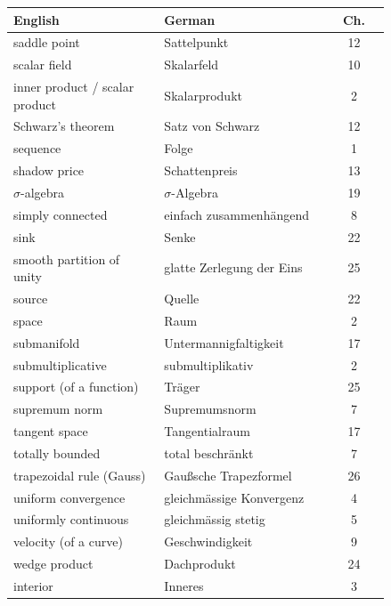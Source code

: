 \begin{center}
\begin{tabular}{@{}p{0.40\linewidth} p{0.44\linewidth} c@{}}
\textbf{English} & \textbf{German} & \textbf{Ch.} \\
\hline
saddle point & Sattelpunkt & 12 \\
scalar field & Skalarfeld & 10 \\
inner product / scalar product & Skalarprodukt & 2 \\
Schwarz's theorem & Satz von Schwarz & 12 \\
sequence & Folge & 1 \\
shadow price & Schattenpreis & 13 \\
$\sigma$-algebra & $\sigma$-Algebra & 19 \\
simply connected & einfach zusammenhängend & 8 \\
sink & Senke & 22 \\
smooth partition of unity & glatte Zerlegung der Eins & 25 \\
source & Quelle & 22 \\
space & Raum & 2 \\
submanifold & Untermannigfaltigkeit & 17 \\
submultiplicative & submultiplikativ & 2 \\
support (of a function) & Träger & 25 \\
supremum norm & Supremumsnorm & 7 \\
tangent space & Tangentialraum & 17 \\
totally bounded & total beschränkt & 7 \\
trapezoidal rule (Gauss) & Gaußsche Trapezformel & 26 \\
uniform convergence & gleichmässige Konvergenz & 4 \\
uniformly continuous & gleichmässig stetig & 5 \\
velocity (of a curve) & Geschwindigkeit & 9 \\
wedge product & Dachprodukt & 24 \\
interior & Inneres & 3 \\
\end{tabular}
\end{center}

